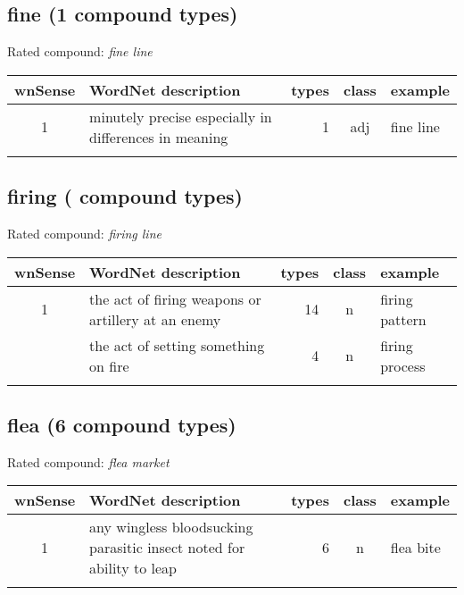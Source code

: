 \subsection{fine        (1 compound types)}
Rated compound: \emph{fine line}

\vspace*{1ex}

\noindent
\begin{longtable}{c>{\raggedright\arraybackslash}p{5cm}rc>{\raggedright\arraybackslash}p{2cm}}\lsptoprule
{\small wnSense}&WordNet description&types&class&example\\\midrule
1&minutely precise especially in differences in meaning&1&adj&fine line\\\lspbottomrule
\end{longtable}

\subsection{firing       ( compound types)}
Rated compound: \emph{firing line}

\vspace*{1ex}

\noindent
\begin{longtable}{c>{\raggedright\arraybackslash}p{5cm}rc>{\raggedright\arraybackslash}p{2cm}}\lsptoprule
{\small wnSense}&WordNet description&types&class&example\\\midrule
1&the act of firing weapons or artillery at an enemy&14&n&firing pattern\\\tablevspace
3&the act of setting something on fire&4&n&firing process\\\lspbottomrule
\end{longtable}

\subsection{flea         (6 compound types)}
Rated compound: \emph{flea market}

\vspace*{1ex}

\noindent
\begin{longtable}{c>{\raggedright\arraybackslash}p{5cm}rc>{\raggedright\arraybackslash}p{2cm}}\lsptoprule
{\small wnSense}&WordNet description&types&class&example\\\midrule
1&any wingless bloodsucking parasitic insect noted for ability to leap&6&n&flea bite\\\lspbottomrule
\end{longtable}

